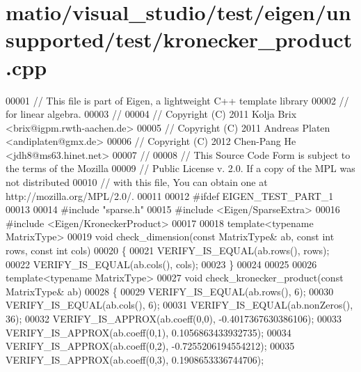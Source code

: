 \hypertarget{matio_2visual__studio_2test_2eigen_2unsupported_2test_2kronecker__product_8cpp_source}{}\section{matio/visual\+\_\+studio/test/eigen/unsupported/test/kronecker\+\_\+product.cpp}
\label{matio_2visual__studio_2test_2eigen_2unsupported_2test_2kronecker__product_8cpp_source}

\begin{DoxyCode}
00001 \textcolor{comment}{// This file is part of Eigen, a lightweight C++ template library}
00002 \textcolor{comment}{// for linear algebra.}
00003 \textcolor{comment}{//}
00004 \textcolor{comment}{// Copyright (C) 2011 Kolja Brix <brix@igpm.rwth-aachen.de>}
00005 \textcolor{comment}{// Copyright (C) 2011 Andreas Platen <andiplaten@gmx.de>}
00006 \textcolor{comment}{// Copyright (C) 2012 Chen-Pang He <jdh8@ms63.hinet.net>}
00007 \textcolor{comment}{//}
00008 \textcolor{comment}{// This Source Code Form is subject to the terms of the Mozilla}
00009 \textcolor{comment}{// Public License v. 2.0. If a copy of the MPL was not distributed}
00010 \textcolor{comment}{// with this file, You can obtain one at http://mozilla.org/MPL/2.0/.}
00011 
00012 \textcolor{preprocessor}{#ifdef EIGEN\_TEST\_PART\_1}
00013 
00014 \textcolor{preprocessor}{#include "sparse.h"}
00015 \textcolor{preprocessor}{#include <Eigen/SparseExtra>}
00016 \textcolor{preprocessor}{#include <Eigen/KroneckerProduct>}
00017 
00018 \textcolor{keyword}{template}<\textcolor{keyword}{typename} MatrixType>
00019 \textcolor{keywordtype}{void} check\_dimension(\textcolor{keyword}{const} MatrixType& ab, \textcolor{keyword}{const} \textcolor{keywordtype}{int} rows,  \textcolor{keyword}{const} \textcolor{keywordtype}{int} cols)
00020 \{
00021   VERIFY\_IS\_EQUAL(ab.rows(), rows);
00022   VERIFY\_IS\_EQUAL(ab.cols(), cols);
00023 \}
00024 
00025 
00026 \textcolor{keyword}{template}<\textcolor{keyword}{typename} MatrixType>
00027 \textcolor{keywordtype}{void} check\_kronecker\_product(\textcolor{keyword}{const} MatrixType& ab)
00028 \{
00029   VERIFY\_IS\_EQUAL(ab.rows(), 6);
00030   VERIFY\_IS\_EQUAL(ab.cols(), 6);
00031   VERIFY\_IS\_EQUAL(ab.nonZeros(),  36);
00032   VERIFY\_IS\_APPROX(ab.coeff(0,0), -0.4017367630386106);
00033   VERIFY\_IS\_APPROX(ab.coeff(0,1),  0.1056863433932735);
00034   VERIFY\_IS\_APPROX(ab.coeff(0,2), -0.7255206194554212);
00035   VERIFY\_IS\_APPROX(ab.coeff(0,3),  0.1908653336744706);

\end{DoxyCode}
